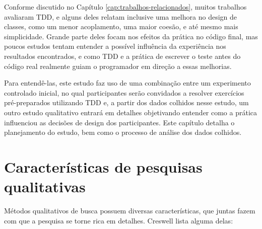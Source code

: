 Conforme discutido no Capítulo \ref{cap:trabalhos-relacionados}, muitos 
trabalhos avaliaram TDD, e alguns deles relatam inclusive uma melhora
no design de classes, como um menor acoplamento, uma maior coesão, e até mesmo
mais simplicidade. 
Grande parte deles focam nos efeitos da prática no código final, mas poucos 
estudos tentam entender a possível influência da experiência
nos resultados encontrados, e como TDD e a prática de escrever o teste 
antes do código real realmente guiam o programador 
em direção a essas melhorias.

Para entendê-las, este estudo faz uso de uma combinação entre um experimento controlado inicial, no qual participantes serão
convidados a resolver exercícios pré-preparados utilizando TDD e, a partir dos dados colhidos nesse estudo, um outro
estudo qualitativo entrará em detalhes objetivando entender como a prática influenciou as decisões de design dos participantes.
Este capítulo detalha o planejamento do estudo, bem como o processo de análise dos dados colhidos.


\section{Características de pesquisas qualitativas}

Métodos qualitativos de busca possuem diversas características, que juntas fazem
com que a pesquisa se torne rica em detalhes. Creswell \cite{creswell} lista
alguma delas:

